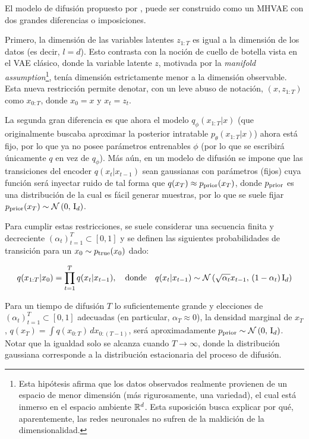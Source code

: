 El modelo de difusión propuesto por \cite{ho2020denoising}, puede ser construido como un MHVAE con dos grandes diferencias o imposiciones.

Primero, la dimensión de las variables latentes $z_{1:T}$ es igual a la dimensión de los datos (es decir, $l=d$). Esto contrasta con la noción de cuello de botella vista en el VAE clásico, donde la variable latente $z$, motivada por la \textit{manifold assumption}\footnote{Esta hipótesis afirma que los datos observados realmente provienen de un espacio de menor dimensión (más rigurosamente, una variedad), el cual está inmerso en el espacio ambiente $\mathbb{R}^d$. Esta suposición busca explicar por qué, aparentemente, las redes neuronales no sufren de la maldición de la dimensionalidad.}, tenía dimensión estrictamente menor a la dimensión observable. Esta nueva restricción permite denotar, con un leve abuso de notación, $(x, z_{1:T})$ como $x_{0:T}$, donde $x_0=x$ y $x_t=z_t$.

La segunda gran diferencia es que ahora el modelo $q_\phi(x_{1:T}|x)$ (que originalmente buscaba aproximar la posterior intratable $p_\theta(x_{1:T}|x)$) ahora está fijo, por lo que ya no posee parámetros entrenables $\phi$ (por lo que se escribirá únicamente $q$ en vez de $q_\phi$). Más aún, en un modelo de difusión se impone que las transiciones del encoder $q(x_t|x_{t-1})$ sean gaussianas con parámetros (fijos) cuya función será inyectar ruido de tal forma que $q(x_T)\approx p_{\operatorname{prior}}(x_T)$, donde $p_{\operatorname{prior}}$ es una distribución de la cual es fácil generar muestras, por lo que se suele fijar $p_{\operatorname{prior}}(x_T)\sim\mathcal{N}\left(0,\,\operatorname{I}_{d}\right)$.

Para cumplir estas restricciones, se suele considerar una secuencia finita y decreciente $(\alpha_t)_{t=1}^T\subset[0,1]$ y se definen las siguientes probabilidades de transición para un $x_0\sim p_{\operatorname{true}}(x_0)$ dado:

\begin{equation}
    \label{eq:ddpm_forward}
    q(x_{1:T}|x_0) = \prod_{t=1}^{T} q(x_t|x_{t-1}),
    \quad\text{donde}\quad
    q(x_t|x_{t-1}) \sim \mathcal{N}\left(\sqrt{\alpha_t} x_{t-1},\,(1-\alpha_t)\operatorname{I}_{d}\right)
\end{equation}

Para un tiempo de difusión $T$ lo suficientemente grande y elecciones de $(\alpha_t)_{t=1}^T\subset[0,1]$ adecuadas (en particular, $\alpha_T\approx 0$), la densidad marginal de $x_T$, $q(x_T)=\int q(x_{0:T})\, dx_{0:(T-1)}$, será aproximadamente $p_{\operatorname{prior}}\sim\mathcal{N}\left(0,\,\operatorname{I}_{d}\right)$. Notar que la igualdad solo se alcanza cuando $T\to\infty$, donde la distribución gaussiana corresponde a la distribución estacionaria del proceso de difusión.

